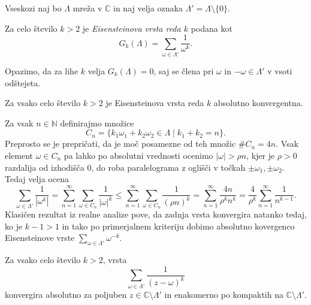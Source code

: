\documentclass[mat1]{fmfdelo}
\newcommand{\N}{\mathbb N}
\newcommand{\C}{\mathbb C}
\newcommand{\om}{\omega}
\theoremstyle{definition}
\begin{document}
Vseskozi naj bo $\Lambda$ mreža v $\C$ in naj velja oznaka $\Lambda' = \Lambda \setminus \{0\}$.

\begin{definicija}
    \label{eisensteinova vrsta}
    Za celo število $k > 2$ je \emph{Eisensteinova vrsta reda $k$} podana kot
    \[
        G_k(\Lambda) = \sum_{\om \in \Lambda'} \frac{1}{\om^k}.  
    \]
\end{definicija}

\begin{opomba}
    Opazimo, da za lihe $k$ velja $G_k(\Lambda) = 0$, saj se člena pri $\om$ in $-\om\in\Lambda'$ v vsoti odštejeta. 
\end{opomba}

\begin{lema}
    \label{lema o konvergenci eisensteinove vrste}
    Za vsako celo število $k > 2$ je Eisensteinova vrsta reda $k$ absolutno konvergentna.
\end{lema}

\begin{dokaz}
    Za vsak $n \in \N$ definirajmo množice
    \[
        C_n = \{k_1 \om_1 + k_2 \om_2\in \Lambda \mid k_1 + k_2 = n\}.  
    \]
    Preprosto se je prepričati, da je moč posamezne od teh množic $\#C_n = 4n$. Vsak element $\om \in C_n$ pa lahko po absolutni vrednosti ocenimo $\left\lvert \om \right\rvert > \rho n$, kjer je $\rho > 0$ razdalija od izhodišča $0$, do roba paralelograma z oglišči v točkah $\pm \om_1, \pm \om_2$. Tedaj velja ocena
    \[
        \sum_{\om \in \Lambda'} \frac{1}{\left\lvert  \om^k \right\rvert} = 
        \sum_{n = 1}^\infty \sum_{\om \in C_n} \frac{1}{\left\lvert  \om \right\rvert^k} \leq
        \sum_{n = 1}^\infty \sum_{\om \in C_n} \frac{1}{(\rho n)^k} =
        \sum_{n = 1}^\infty \frac{4n}{\rho^k n^k} = 
        \frac{4}{\rho^k} \sum_{n = 1}^\infty \frac{1}{n^{k-1}}.
    \]
    Klasičen rezultat iz realne analize pove, da zadnja vrsta konvergira natanko tedaj, ko je $k - 1 > 1$ in tako po primerjalnem kriteriju dobimo absolutno kovergenco Eisensteinove vrste $\sum_{\om \in \Lambda'} \om^{-k}$.
\end{dokaz}

\begin{lema}
    \label{lema o absolutni in enakomerni konvergenci}
    Za vsako celo število $k > 2$, vrsta 
    \[
        \sum_{\om \in \Lambda'} \frac{1}{(z - \om)^k}
    \]
    konvergira absolutno za poljuben $z\in \C\setminus\Lambda'$ in enakomerno po kompaktih na $\C \setminus \Lambda'$. 
\end{lema}
\end{document}
